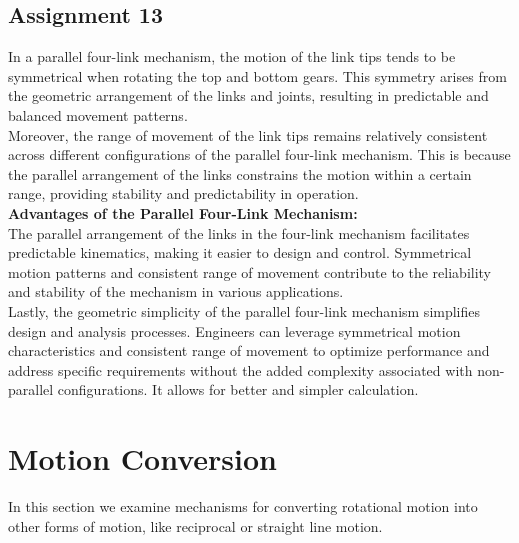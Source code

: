 \documentclass[12pt,a4paper]{report}
\begin{document}
\subsection{\textbf{Assignment 13}}
In a parallel four-link mechanism, the motion of the link tips tends to be symmetrical when rotating the top and bottom gears. 
This symmetry arises from the geometric arrangement of the links and joints, resulting in predictable and balanced movement 
patterns.\\
Moreover, the range of movement of the link tips remains relatively consistent across different configurations of the parallel 
four-link mechanism. This is because the parallel arrangement of the links constrains the motion within a certain range, 
providing stability and predictability in operation.\\
\textbf{Advantages of the Parallel Four-Link Mechanism:}\\
The parallel arrangement of the links in the four-link mechanism facilitates predictable kinematics, 
making it easier to design and control. Symmetrical motion patterns and consistent range of movement 
contribute to the reliability and stability of the mechanism in various applications.\\
Lastly, the geometric simplicity of the parallel four-link mechanism simplifies design and analysis processes. 
Engineers can leverage symmetrical motion characteristics and consistent range of movement to optimize performance 
and address specific requirements without the added complexity associated with non-parallel configurations. It allows 
for better and simpler calculation. \\

\section{Motion Conversion}
In this section we examine mechanisms for converting rotational motion into other forms of motion, like reciprocal or 
straight line motion. 
\end{document}

